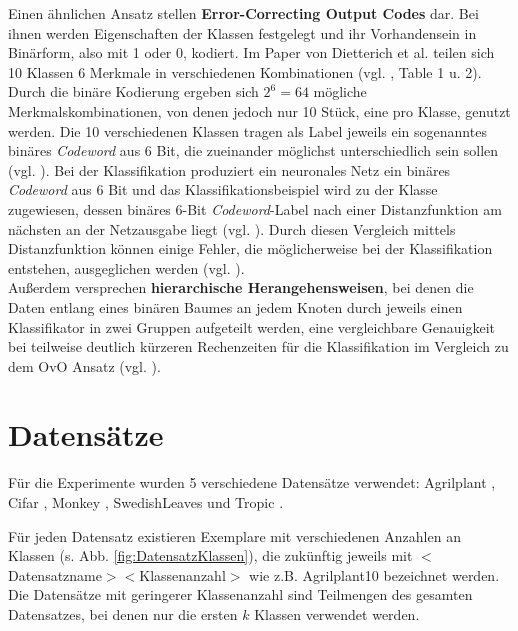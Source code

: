 Einen ähnlichen Ansatz stellen \textbf{Error-Correcting Output Codes} \cite{errorCorrectingCodes} dar. Bei ihnen werden Eigenschaften der Klassen festgelegt und ihr Vorhandensein in Binärform, also mit 1 oder 0, kodiert. Im Paper von Dietterich et al. \cite{errorCorrectingCodes} teilen sich 10 Klassen 6 Merkmale in verschiedenen Kombinationen (vgl. \cite{errorCorrectingCodes}, Table 1 u. 2). Durch die binäre Kodierung ergeben sich $2^6 = 64$ mögliche Merkmalskombinationen, von denen jedoch nur 10 Stück, eine pro Klasse, genutzt werden. Die 10 verschiedenen Klassen tragen als Label jeweils ein sogenanntes binäres \textit{Codeword} aus 6 Bit, die zueinander möglichst unterschiedlich sein sollen (vgl. \cite{errorCorrectingCodes}). Bei der Klassifikation produziert ein neuronales Netz ein binäres \textit{Codeword} aus 6 Bit und das Klassifikationsbeispiel wird zu der Klasse zugewiesen, dessen binäres 6-Bit \textit{Codeword}-Label nach einer Distanzfunktion am nächsten an der Netzausgabe liegt (vgl. \cite{errorCorrectingCodes}). Durch diesen Vergleich mittels Distanzfunktion können einige Fehler, die möglicherweise bei der Klassifikation entstehen, ausgeglichen werden (vgl. \cite{errorCorrectingCodes}).\\


Außerdem versprechen \textbf{hierarchische Herangehensweisen}, bei denen die Daten entlang eines binären Baumes an jedem Knoten durch jeweils einen Klassifikator in zwei Gruppen aufgeteilt werden, eine vergleichbare Genauigkeit bei teilweise deutlich kürzeren Rechenzeiten für die Klassifikation im Vergleich zu dem OvO Ansatz (vgl. \cite{hierarchischeMethoden}).

\newpage
\section{Datensätze}
\label{ch:methodik_datensaetze}
Für die Experimente wurden 5 verschiedene Datensätze verwendet: Agrilplant \cite{pawaraWebsiteDatensaetze}, Cifar \cite{cifar10}, Monkey \cite{pawaraWebsiteDatensaetze}, SwedishLeaves \cite{swedishLeaves} und Tropic \cite{pawaraWebsiteDatensaetze}.

Für jeden Datensatz existieren Exemplare mit verschiedenen Anzahlen an Klassen (s. Abb. \ref{fig:DatensatzKlassen}), die zukünftig jeweils mit $<$Datensatzname$><$Klassenanzahl$>$ wie z.B. Agrilplant10 bezeichnet werden.
Die Datensätze mit geringerer Klassenanzahl sind Teilmengen des gesamten Datensatzes, bei denen nur die ersten $k$ Klassen verwendet werden.

